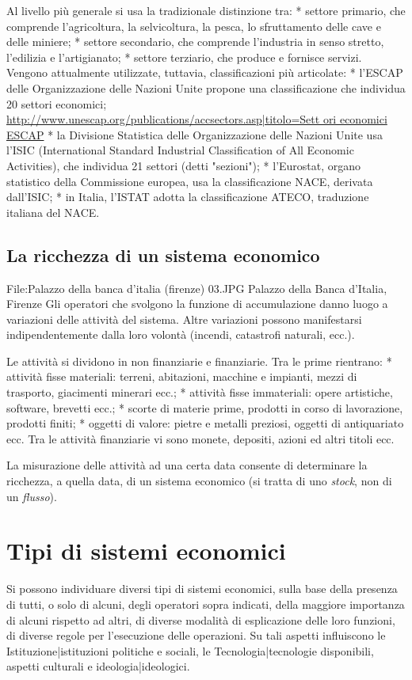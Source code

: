 Al livello più generale si usa la tradizionale distinzione tra:
* settore primario, che comprende l'agricoltura, la selvicoltura, 
la pesca, lo sfruttamento delle cave e delle miniere;
* settore secondario, che comprende l'industria in senso stretto, 
l'edilizia e l'artigianato;
* settore terziario, che produce e fornisce servizi.
Vengono attualmente utilizzate, tuttavia, classificazioni più articolate:
* l'ESCAP delle Organizzazione delle Nazioni Unite 
propone una classificazione che individua 20 settori 
economici;
\url{http://www.unescap.org/publications/accsectors.asp|titolo=Sett
ori economici ESCAP}
* la Divisione Statistica delle Organizzazione delle Nazioni 
Unite usa l'ISIC (International Standard Industrial Classification of All 
Economic Activities), che individua 21 settori (detti "sezioni");
* l'Eurostat, organo statistico della Commissione europea, usa la 
classificazione NACE, derivata dall'ISIC;
* in Italia, l'ISTAT adotta la classificazione ATECO, traduzione 
italiana del NACE.

\subsection{La ricchezza di un sistema economico}

File:Palazzo della banca d'italia (firenze) 03.JPG Palazzo della 
Banca d'Italia, Firenze
Gli operatori che svolgono la funzione di accumulazione danno luogo a 
variazioni delle attività del sistema. Altre variazioni possono 
manifestarsi indipendentemente dalla loro volontà (incendi, catastrofi 
naturali, ecc.).

Le attività si dividono in non finanziarie e finanziarie. Tra le 
prime rientrano:
* attività fisse materiali: terreni, abitazioni, macchine e impianti, mezzi 
di trasporto, giacimenti minerari ecc.;
* attività fisse immateriali: opere artistiche, software, brevetti ecc.;
* scorte di materie prime, prodotti in corso di lavorazione, prodotti 
finiti;
* oggetti di valore: pietre e metalli preziosi, oggetti 
di antiquariato ecc.
Tra le attività finanziarie vi sono monete, depositi, azioni ed altri titoli 
ecc.

La misurazione delle attività ad una certa data consente di determinare la 
ricchezza, a quella data, di un sistema economico (si tratta di uno 
\emph{stock}, non di un \emph{flusso}).

\section{Tipi di sistemi economici}
Si possono individuare diversi tipi di sistemi economici, sulla base della 
presenza di tutti, o solo di alcuni, degli operatori sopra indicati, della 
maggiore importanza di alcuni rispetto ad altri, di diverse modalità di 
esplicazione delle loro funzioni, di diverse regole per l'esecuzione delle 
operazioni. Su tali aspetti influiscono 
le Istituzione|istituzioni politiche e sociali, le 
Tecnologia|tecnologie disponibili, aspetti culturali e 
ideologia|ideologici.

